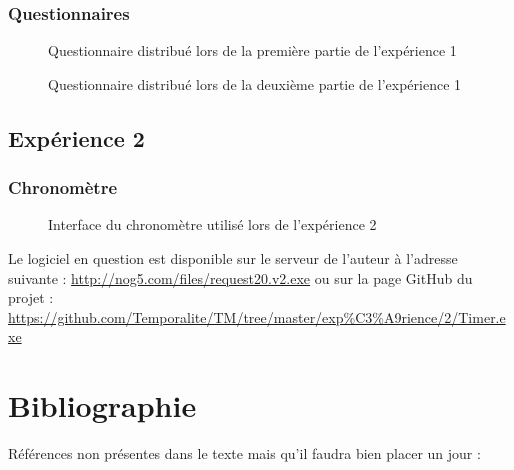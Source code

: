 \documentclass[12pt,fleqn,oneside,openany]{book} %
\begin{document}
\newpage
\subsection*{Questionnaires} \label{sec:Questionnaires}
\begin{figure}[htp] 
	\caption{Questionnaire distribué lors de la première partie de l'expérience 1}
\end{figure}

\newpage
\begin{figure}[htp] 
	\caption{Questionnaire distribué lors de la deuxième partie de l'expérience 1}
\end{figure}

\newpage
\section*{Expérience 2}

\subsection*{Chronomètre} \label{sec:chrono}
\begin{figure}[htp] 
	\caption{Interface du chronomètre utilisé lors de l'expérience 2}
\end{figure}
Le logiciel en question est disponible sur le serveur de l'auteur à l'adresse suivante : \url{http://nog5.com/files/request20.v2.exe} ou sur la page GitHub du projet : \url{https://github.com/Temporalite/TM/tree/master/exp%C3%A9rience/2/Timer.exe}



\chapter{Bibliographie}
Références non présentes dans le texte mais qu'il faudra bien placer un jour : \cite{ref1} \cite{vidnul} \cite{vidcool} \cite{imgtitre} \cite{imgheader1} \cite{analysedonnees}
\end{document}
